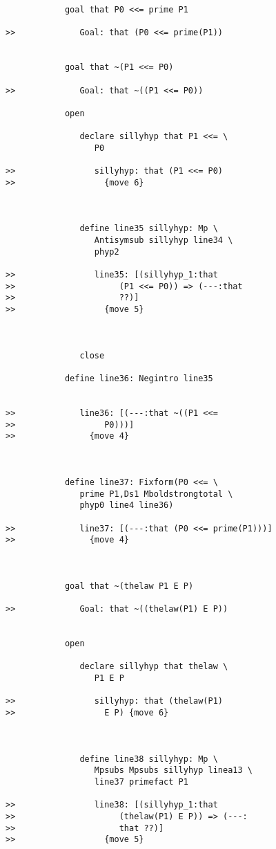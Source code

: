 \documentclass[12pt]{article}
\begin{document}
\begin{verbatim}
            goal that P0 <<= prime P1

>>             Goal: that (P0 <<= prime(P1))


            goal that ~(P1 <<= P0)

>>             Goal: that ~((P1 <<= P0))

            open

               declare sillyhyp that P1 <<= \
                  P0

>>                sillyhyp: that (P1 <<= P0)
>>                  {move 6}



               define line35 sillyhyp: Mp \
                  Antisymsub sillyhyp line34 \
                  phyp2

>>                line35: [(sillyhyp_1:that
>>                     (P1 <<= P0)) => (---:that
>>                     ??)]
>>                  {move 5}



               close

            define line36: Negintro line35


>>             line36: [(---:that ~((P1 <<=
>>                  P0)))]
>>               {move 4}



            define line37: Fixform(P0 <<= \
               prime P1,Ds1 Mboldstrongtotal \
               phyp0 line4 line36)

>>             line37: [(---:that (P0 <<= prime(P1)))]
>>               {move 4}



            goal that ~(thelaw P1 E P)

>>             Goal: that ~((thelaw(P1) E P))


            open

               declare sillyhyp that thelaw \
                  P1 E P

>>                sillyhyp: that (thelaw(P1)
>>                  E P) {move 6}



               define line38 sillyhyp: Mp \
                  Mpsubs Mpsubs sillyhyp linea13 \
                  line37 primefact P1

>>                line38: [(sillyhyp_1:that
>>                     (thelaw(P1) E P)) => (---:
>>                     that ??)]
>>                  {move 5}




\end{verbatim}
\end{document}
